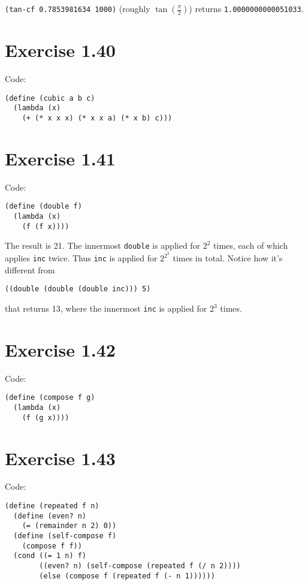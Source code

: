 \documentclass[../main.tex]{subfiles}
\begin{document}
\lstinline{(tan-cf 0.7853981634 1000)} (roughly $\tan(\frac{\pi}{2})$)
 returns \lstinline{1.0000000000051033}.

\section{Exercise 1.40}

Code:

\begin{lstlisting}
(define (cubic a b c)
  (lambda (x)
    (+ (* x x x) (* x x a) (* x b) c)))
\end{lstlisting}

\section{Exercise 1.41}

Code:

\begin{lstlisting}
(define (double f)
  (lambda (x)
    (f (f x))))
\end{lstlisting}

The result is 21. The innermost \lstinline{double}
 is applied for $2^2$ times, each of which applies
 \lstinline{inc} twice. Thus \lstinline{inc} is applied
 for $2^{2^2}$ times in total. Notice how it's
 different from

\begin{lstlisting}
((double (double (double inc))) 5)
\end{lstlisting}

that returns 13, where the innermost \lstinline{inc} is
 applied for $2^3$ times.

\section{Exercise 1.42}

Code:

\begin{lstlisting}
(define (compose f g)
  (lambda (x)
    (f (g x))))
\end{lstlisting}

\section{Exercise 1.43}

Code:

\begin{lstlisting}
(define (repeated f n)
  (define (even? n)
    (= (remainder n 2) 0))
  (define (self-compose f)
    (compose f f))
  (cond ((= 1 n) f)
        ((even? n) (self-compose (repeated f (/ n 2))))
        (else (compose f (repeated f (- n 1))))))
\end{lstlisting}
\end{document}
